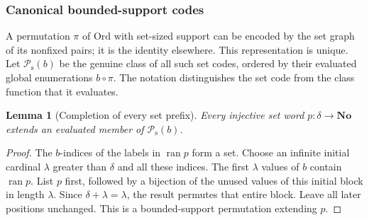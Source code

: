 \documentclass[11pt]{article}
\newtheorem{lemma}[lemma]{Lemma}
\theoremstyle{definition}
\theoremstyle{remark}
\newcommand{\No}{\mathbf{No}}
\newcommand{\Ord}{\mathrm{Ord}}
\newcommand{\Psupp}{\mathcal P_{\mathrm{s}}}
\newcommand{\ran}{\operatorname{ran}}
\begin{document}
\subsubsection{Canonical bounded-support codes}

A permutation $\pi$ of $\Ord$ with set-sized support can be encoded
by the set graph of its nonfixed pairs; it is the identity elsewhere.
This representation is unique. Let $\Psupp(b)$ be the genuine class of all
such set codes, ordered by their evaluated global enumerations
$b\circ\pi$. The notation distinguishes the set code from the class
function that it evaluates.

\begin{lemma}[Completion of every set prefix]
\label{swo:sh:lem:core-completion}
Every injective set word $p:\delta\to\No$ extends an evaluated
member of $\Psupp(b)$.
\end{lemma}
\begin{proof}
The $b$-indices of the labels in $\ran p$ form a set. Choose an
infinite initial cardinal $\lambda$ greater than $\delta$ and all
these indices. The first $\lambda$ values of $b$ contain $\ran p$.
List $p$ first, followed by a bijection of the unused values of this
initial block in length $\lambda$. Since $\delta+\lambda=\lambda$,
the result permutes that entire block. Leave all later positions
unchanged. This is a bounded-support permutation extending $p$.
\end{proof}
\end{document}
